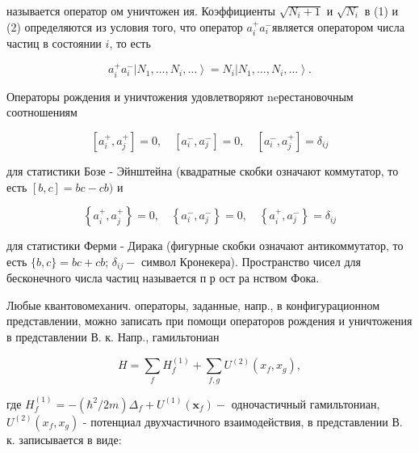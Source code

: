 \documentclass[10pt]{article}
\begin{document}
называется оператор ом уничтожен ия. Коэффициенты $\sqrt{N_{i}+1}$ и $\sqrt{N_{i}}$ в (1) и (2) определяются из условия того, что оператор $a_{i}^{+} a_{i}^{-}$является оператором числа частиц в состоянии $i$, то есть



\[

a_{i}^{+} a_{i}^{-}\left|N_{1}, \ldots, N_{i}, \ldots\right\rangle=N_{i}\left|N_{1}, \ldots, N_{i}, \ldots\right\rangle .

\]



Операторы рождения и уничтожения удовлетворяют neрестановочным соотношениям



\[

\left[a_{i}^{+}, a_{j}^{+}\right]=0, \quad\left[a_{i}^{-}, a_{j}^{-}\right]=0, \quad\left[a_{i}^{-}, a_{j}^{+}\right]=\delta_{i j}

\]



для статистики Бозе - Эйнштейна (квадратные скобки означают коммутатор, то есть $[b, c]=b c-c b)$ и



\[

\left\{a_{i}^{+}, a_{j}^{+}\right\}=0, \quad\left\{a_{i}^{-}, a_{j}^{-}\right\}=0, \quad\left\{a_{i}^{+}, a_{j}^{-}\right\}=\delta_{i j}

\]



для статистики Ферми - Дирака (фигурные скобки означают антикоммутатор, то есть $\{b, c\}=b c+c b$; $\delta_{i j}-$ символ Кронекера). Пространство чисел для бесконечного числа частиц называется п р ост ра нством Фока.



Любые квантовомеханич. операторы, заданные, напр., в конфигурационном представлении, можно записать при помощи операторов рождения и уничтожения в представлении В. к. Напр., гамильтониан



\[

H=\sum_{f} H_{f}^{(1)}+\sum_{f, g} U^{(2)}\left(x_{f}, x_{g}\right),

\]



где $H_{f}^{(1)}=-\left(\hbar^{2} / 2 m\right) \Delta_{f}+U^{(1)}\left(\boldsymbol{x}_{f}\right)-$ одночастичный гамильтониан, $U^{(2)}\left(x_{f}, x_{g}\right)$ - потенциал двухчастичного взаимодействия, в представлении В. к. записывается в виде:
\end{document}
